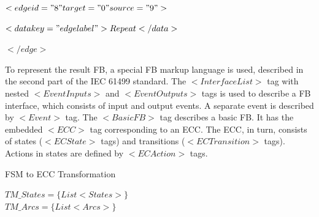 \documentclass[conference]{IEEEtran}
\begin{document}
$<edge id="8" target="0" source="9">$

$<data key="edgelabel">Repeat</data>$

$</edge>$

To represent the result FB, a special FB markup language is used, described in the second part of the IEC 61499 standard. The $<InterfaceList>$ tag with nested $<EventInputs>$ and $<EventOutputs>$ tags is used to describe a FB interface, which consists of input and output events. A separate event is described by $<Event>$ tag. The $<BasicFB>$ tag describes a basic FB. It has the embedded $<ECC>$ tag corresponding to
an ECC. The ECC, in turn, consists of states ($<ECState>$ tags) and transitions ($<ECTransition>$ tags). Actions in states are defined by $<ECAction>$ tags.

\begin{algorithm}
\caption{FSM to ECC Transformation}\label{alg:two}
$TM\_States = \{List<States> \}$ \\
$TM\_Arcs = \{List<Arcs> \}$ \\
\end{algorithm}
\end{document}
